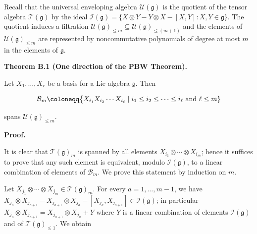 \documentclass[10pt,a4paper]{article}
\begin{document}
Recall that the universal enveloping algebra $\mathcal{U}(\mathfrak{g})$ is the quotient of the tensor algebra $\mathcal{T}(\mathfrak{g})$ by the ideal $\mathcal{I}(\mathfrak{g})=\{X\otimes Y-Y\otimes X-[X,Y]:X,Y\in\mathfrak{g}\}$. The quotient induces a filtration $\mathcal{U}(\mathfrak{g})_{\leq m}\subseteq\mathcal{U}(\mathfrak{g})_{\leq(m+1)}$ and the elements of $\mathcal{U}(\mathfrak{g})_{\leq m}$ are represented by noncommutative polynomials of degree at most $m$ in the elements of $\mathfrak{g}$.





\par\medskip\noindent\textbf{Theorem B.1 (One direction of the PBW Theorem).}\par



Let $X_{1},\ldots,X_{r}$ be a basis for a Lie algebra $\mathfrak{g}$. Then



\[\begin{aligned}
\displaystyle\mathcal{B}_{m}\coloneqq\big{\{}X_{i_{1}}X_{i_{2}}\cdots X_{i_{\ell}}\mid i_{1}\leq i_{2}\leq\cdots\leq i_{\ell}\text{ and }\ell\leq m\}
\end{aligned}\]


spans $\mathcal{U}(\mathfrak{g})_{\leq m}$.






\par\medskip\noindent\textbf{Proof.}\par




It is clear that $\mathcal{T}(\mathfrak{g})_{m}$ is spanned by all elements $X_{i_{1}}\otimes\cdots\otimes X_{i_{m}}$; hence it suffices to prove that any such element is equivalent, modulo $\mathcal{I}(\mathfrak{g})$, to a linear combination of elements of $\mathcal{B}_{m}$. We prove this statement by induction on $m$.





Let $X_{j_{1}}\otimes\cdots\otimes X_{j_{m}}\in\mathcal{T}(\mathfrak{g})_{m}$. For every $a=1,\ldots,m-1$, we have $X_{j_{a}}\otimes X_{j_{a+1}}-X_{j_{a+1}}\otimes X_{j_{a}}-[X_{j_{a}},X_{j_{a+1}}]\in\mathcal{I}(\mathfrak{g})$; in particular $X_{j_{a}}\otimes X_{j_{a+1}}=X_{j_{a+1}}\otimes X_{j_{a}}+Y$ where $Y$ is a linear combination of elements $\mathcal{I}(\mathfrak{g})$ and of $\mathcal{T}(\mathfrak{g})_{\leq 1}$. We obtain
\end{document}
